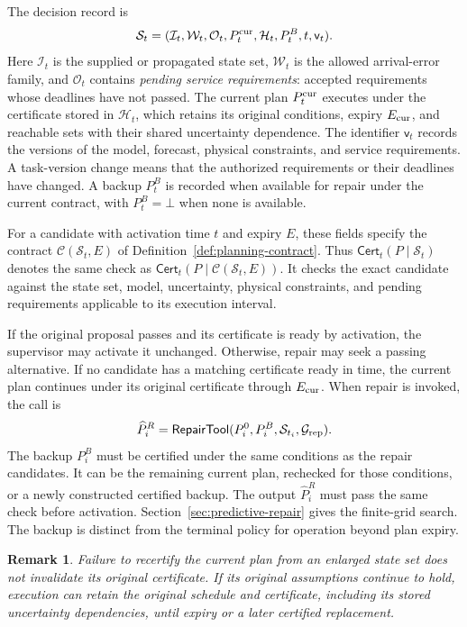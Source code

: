 \documentclass[preprint,12pt]{elsarticle}
\theoremstyle{definition}
\theoremstyle{plain}
\newtheorem{remark}{Remark}
\theoremstyle{definition}
\theoremstyle{plain}
\begin{document}
The decision record is
\[
\mathcal S_t=(\mathcal I_t,\mathcal W_t,\mathcal O_t,
P_t^{\rm cur},\mathcal H_t,P_t^B,t,\mathsf v_t).
\]
Here $\mathcal I_t$ is the supplied or propagated state set,
$\mathcal W_t$ is the allowed arrival-error family, and $\mathcal O_t$
contains \emph{pending service requirements}: accepted requirements whose
deadlines have not passed. The current plan $P_t^{\rm cur}$ executes
under the certificate stored in $\mathcal H_t$, which retains its
original conditions, expiry $E_{\rm cur}$, and reachable sets with their
shared uncertainty dependence. The identifier $\mathsf v_t$ records the
versions of the model, forecast, physical constraints, and service
requirements. A task-version change means that the authorized requirements
or their deadlines have changed. A backup $P_t^B$ is recorded when
available for repair under the current contract, with $P_t^B=\bot$ when
none is available.

For a candidate with activation time $t$ and expiry $E$, these fields
specify the contract $\mathcal C(\mathcal S_t,E)$ of
Definition~\ref{def:planning-contract}. Thus
$\mathsf{Cert}_t(P\mid\mathcal S_t)$ denotes the same check as
$\mathsf{Cert}_t(P\mid\mathcal C(\mathcal S_t,E))$. It checks the exact
candidate against the state set, model, uncertainty, physical constraints,
and pending requirements applicable to its execution interval.

If the original proposal passes and its certificate is ready by
activation, the supervisor may activate it unchanged. Otherwise, repair
may seek a passing alternative. If no candidate has a matching
certificate ready in time, the current plan continues under its original
certificate through $E_{\rm cur}$. When repair is invoked, the call is
\begin{equation}
\widehat P_i^R=\mathsf{RepairTool}
(P_i^0,P_i^B,\mathcal S_{t_i},\mathcal G_{\rm rep}).
\label{eq:repair-tool-interface}
\end{equation}
The backup $P_i^B$ must be certified under the same conditions as the
repair candidates. It can be the remaining current plan, rechecked for
those conditions, or a newly constructed certified backup. The output
$\widehat P_i^R$ must pass the same check before activation.
Section~\ref{sec:predictive-repair} gives the finite-grid search.
The backup is distinct from the terminal policy for operation beyond
plan expiry.

\begin{remark}
Failure to recertify the current plan from an enlarged state set does
not invalidate its original certificate. If its original assumptions
continue to hold, execution can retain the original schedule and
certificate, including its stored uncertainty dependencies, until expiry
or a later certified replacement.
\end{remark}
\end{document}
